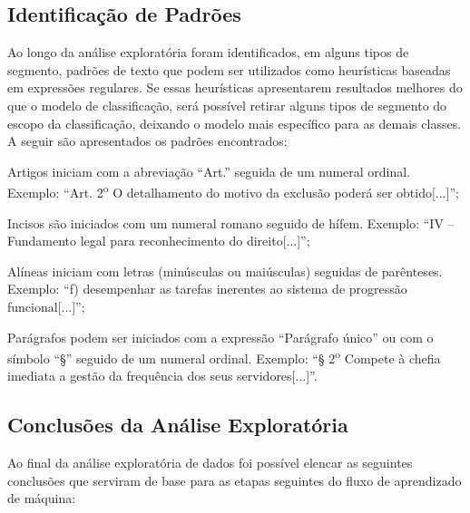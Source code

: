 \subsection{Identificação de Padrões\label{sec:identificacao-padroes-regex}}

Ao longo da análise exploratória foram identificados, em alguns tipos de segmento, padrões de texto  que podem ser utilizados como heurísticas baseadas em expressões regulares. Se essas heurísticas apresentarem resultados melhores do que o modelo de classificação, será possível retirar alguns tipos de segmento do escopo da classificação, deixando o modelo mais específico para as demais classes. A seguir são apresentados os padrões encontrados:

\begin{alineas}
	\item Artigos iniciam com a abreviação ``Art.'' seguida de um numeral ordinal. Exemplo: ``Art. 2\textsuperscript{o} O detalhamento do motivo da exclusão poderá ser obtido[...]'';
	\item Incisos são iniciados com um numeral romano seguido de hífem. Exemplo: ``IV – Fundamento legal para reconhecimento do direito[...]'';
	\item Alíneas iniciam com letras (minúsculas ou maiúsculas) seguidas de parênteses. Exemplo: ``f) desempenhar as tarefas inerentes ao sistema de progressão funcional[...]'';
	\item Parágrafos podem ser iniciados com a expressão ``Parágrafo único'' ou com o símbolo ``§'' seguido de um numeral ordinal. Exemplo: ``§ 2\textsuperscript{o} Compete à chefia imediata a gestão da frequência dos seus servidores[...]''.
\end{alineas}

 \subsection{Conclusões da Análise Exploratória}
 
 Ao final da análise exploratória de dados foi possível elencar as seguintes conclusões que serviram de base para as etapas seguintes do fluxo de aprendizado de máquina:

